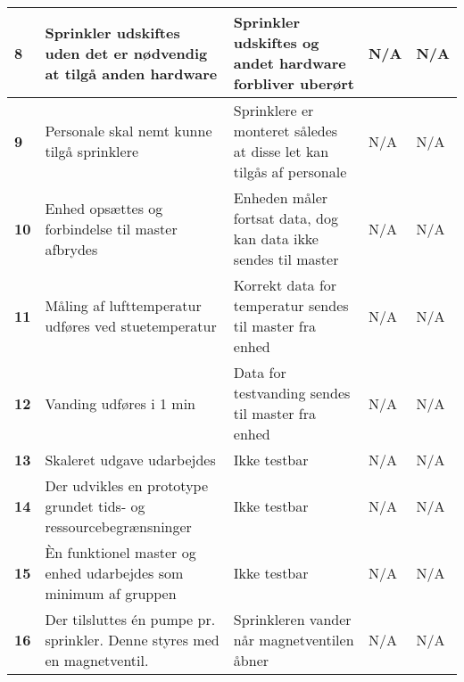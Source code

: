 \begin{center}
\begin{longtable}{|p{}|p{}|p{}|p{}|p{}|}
\textbf{8}	&Sprinkler udskiftes uden det er nødvendig at tilgå anden hardware
			&Sprinkler udskiftes og andet hardware forbliver uberørt
			&N/A
			&N/A \\ \hline 
			
\textbf{9}	&Personale skal nemt kunne tilgå sprinklere
			&Sprinklere er monteret således at disse let kan tilgås af personale
			&N/A
			&N/A \\ \hline 
			
			
\textbf{10}	&Enhed opsættes og forbindelse til master afbrydes
			&Enheden måler fortsat data, dog kan data ikke sendes til master
			&N/A
			&N/A \\ \hline 
			
\textbf{11}	&Måling af lufttemperatur udføres ved stuetemperatur
			&Korrekt data for temperatur sendes til master fra enhed
			&N/A
			&N/A \\ \hline 
			
\textbf{12}	&Vanding udføres i 1 min 
			&Data for testvanding sendes til master fra enhed
			&N/A
			&N/A \\ \hline 
			
			
\textbf{13}	&Skaleret udgave udarbejdes
			&Ikke testbar
			&N/A
			&N/A \\ \hline 
			
\textbf{14}	&Der udvikles en prototype grundet tids- og ressourcebegrænsninger
			&Ikke testbar
			&N/A
			&N/A \\ \hline 
			
\textbf{15}	&Èn funktionel master og enhed udarbejdes som minimum af gruppen
			&Ikke testbar
			&N/A
			&N/A \\ \hline 

\textbf{16}	&Der tilsluttes én pumpe pr. sprinkler. Denne styres med en magnetventil.  
			&Sprinkleren vander når magnetventilen åbner
			&N/A
			&N/A \\ \hline 			
\end{longtable}
	\label{ATIFKrav} 
\end{center}


